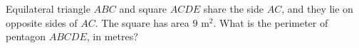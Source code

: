 Equilateral triangle $ABC$ and square $ACDE$ share the side $AC$, and they lie on opposite sides of $AC$. The square has area $9\text{ m}^2$. What is the perimeter of pentagon $ABCDE$, in metres?
